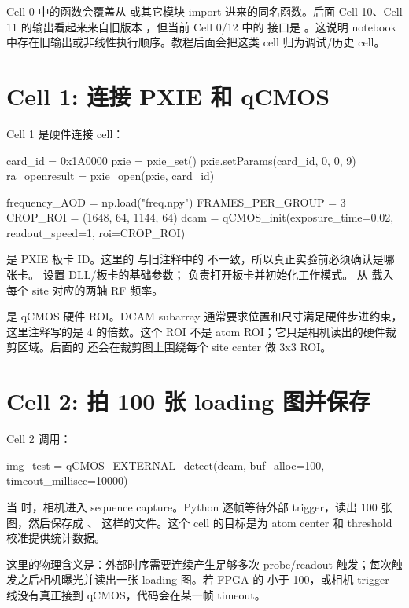 \documentclass[11pt,oneside,openany]{book}
\begin{document}
\begin{notebox}[重要现象]
Cell 0 中的函数会覆盖从  或其它模块 import 进来的同名函数。后面 Cell 10、Cell 11 的输出看起来来自旧版本 ，但当前 Cell 0/12 中的  接口是 。这说明 notebook 中存在旧输出或非线性执行顺序。教程后面会把这类 cell 归为调试/历史 cell。
\end{notebox}

\section{Cell 1: 连接 PXIE 和 qCMOS}
Cell 1 是硬件连接 cell：
\begin{codeblock}[Python]
card_id = 0x1A0000
pxie = pxie_set()
pxie.setParams(card_id, 0, 0, 9)
ra_openresult = pxie_open(pxie, card_id)

frequency_AOD = np.load("freq.npy")
FRAMES_PER_GROUP = 3
CROP_ROI = (1648, 64, 1144, 64)
dcam = qCMOS_init(exposure_time=0.02, readout_speed=1, roi=CROP_ROI)
\end{codeblock}

 是 PXIE 板卡 ID。这里的  与旧注释中的  不一致，所以真正实验前必须确认是哪张卡。  设置 DLL/板卡的基础参数； 负责打开板卡并初始化工作模式。  从  载入每个 site 对应的两轴 RF 频率。

 是 qCMOS 硬件 ROI。DCAM subarray 通常要求位置和尺寸满足硬件步进约束，这里注释写的是 4 的倍数。这个 ROI 不是 atom ROI；它只是相机读出的硬件裁剪区域。后面的  还会在裁剪图上围绕每个 site center 做 3x3 ROI。

\section{Cell 2: 拍 100 张 loading 图并保存}
Cell 2 调用：
\begin{codeblock}[Python]
img_test = qCMOS_EXTERNAL_detect(dcam, buf_alloc=100, timeout_millisec=10000)
\end{codeblock}
当  时，相机进入 sequence capture。Python 逐帧等待外部 trigger，读出 100 张图，然后保存成 、 这样的文件。这个 cell 的目标是为 atom center 和 threshold 校准提供统计数据。

这里的物理含义是：外部时序需要连续产生足够多次 probe/readout 触发；每次触发之后相机曝光并读出一张 loading 图。若 FPGA 的  小于 100，或相机 trigger 线没有真正接到 qCMOS，代码会在某一帧 timeout。
\end{document}
